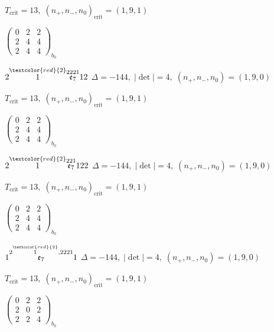 \documentclass[10pt]{article}
\begin{document}
\hspace{1em}$T_{\text{crit}}=13,\; (n_+,n_-,n_0)_{\text{crit}}=(1,9,1)$

\hspace{2em}$\left(\begin{smallmatrix}0 & 2 & 2 \\ 2 & 4 & 4 \\ 2 & 4 & 4\end{smallmatrix}\right)_{\!b_0}$

\smallskip

$2\overset{\textcolor{red}{2}}{1}\overset{2221}{\mathfrak{e}_7}12$ \quad $\Delta=-144,\; |\det|=4,\; (n_+,n_-,n_0)=(1,9,0)$

\hspace{1em}$T_{\text{crit}}=13,\; (n_+,n_-,n_0)_{\text{crit}}=(1,9,1)$

\hspace{2em}$\left(\begin{smallmatrix}0 & 2 & 2 \\ 2 & 4 & 4 \\ 2 & 4 & 4\end{smallmatrix}\right)_{\!b_0}$

\smallskip

$2\overset{\textcolor{red}{2}}{1}\overset{221}{\mathfrak{e}_7}122$ \quad $\Delta=-144,\; |\det|=4,\; (n_+,n_-,n_0)=(1,9,0)$

\hspace{1em}$T_{\text{crit}}=13,\; (n_+,n_-,n_0)_{\text{crit}}=(1,9,1)$

\hspace{2em}$\left(\begin{smallmatrix}0 & 2 & 2 \\ 2 & 4 & 4 \\ 2 & 4 & 4\end{smallmatrix}\right)_{\!b_0}$

\smallskip

$1\overset{2\overset{\textcolor{red}{2}}{1},2221}{\mathfrak{e}_7}1$ \quad $\Delta=-144,\; |\det|=4,\; (n_+,n_-,n_0)=(1,9,0)$

\hspace{1em}$T_{\text{crit}}=13,\; (n_+,n_-,n_0)_{\text{crit}}=(1,9,1)$

\hspace{2em}$\left(\begin{smallmatrix}0 & 2 & 2 \\ 2 & 0 & 2 \\ 2 & 2 & 4\end{smallmatrix}\right)_{\!b_0}$
\end{document}
